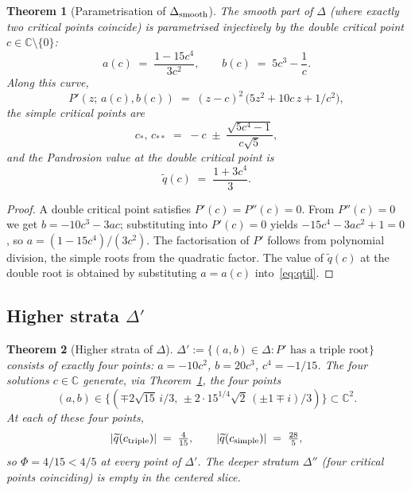 \documentclass[11pt,a4paper]{article}
\newtheorem{theorem}{Theorem}[section]
\begin{document}
\begin{theorem}[Parametrisation of $\Delta_{\rm smooth}$]
\label{thm:param}
The smooth part of $\Delta$ (where exactly two critical points coincide)
is parametrised injectively by the double critical point $c \in
\mathbb{C}\setminus\{0\}$:
\begin{equation}
\boxed{\;
a(c) \;=\; \frac{1 - 15 c^4}{3 c^2},
\qquad
b(c) \;=\; 5 c^3 - \frac{1}{c}.
\;}
\label{eq:param}
\end{equation}
Along this curve,
\begin{equation}
P'(z;\,a(c),b(c)) \;=\; (z-c)^2\,\bigl(5 z^2 + 10 c\,z + 1/c^2\bigr),
\end{equation}
the simple critical points are
\begin{equation}
c_*,\,c_{**} \;=\; -c \;\pm\; \frac{\sqrt{5 c^4 - 1}}{c\sqrt{5}},
\end{equation}
and the Pandrosion value at the double critical point is
\begin{equation}
\boxed{\;
\widetilde q(c) \;=\; \frac{1 + 3 c^4}{3}.
\;}
\label{eq:qtil-double}
\end{equation}
\end{theorem}

\begin{proof}
A double critical point satisfies $P'(c)=P''(c)=0$. From $P''(c)=0$
we get $b=-10c^3-3ac$; substituting into $P'(c)=0$ yields $-15c^4-3ac^2+1=0$,
so $a=(1-15c^4)/(3c^2)$. The factorisation of $P'$ follows from
polynomial division, the simple roots from the quadratic factor.
The value of $\widetilde q(c)$ at the double root is obtained by
substituting $a=a(c)$ into~\eqref{eq:qtil}.
\end{proof}

\subsection{Higher strata $\Delta'$}

\begin{theorem}[Higher strata of $\Delta$]\label{thm:Delta-prime}
$\Delta':=\{(a,b)\in\Delta : P' \text{ has a triple root}\}$ consists of
exactly four points: $a=-10c^2$, $b=20c^3$, $c^4=-1/15$. The four
solutions $c\in\mathbb{C}$ generate, via Theorem~\ref{thm:param},
the four points
\[
(a,b)\in\bigl\{(\mp 2\sqrt{15}\,i/3,\,\pm 2\cdot 15^{1/4}\sqrt 2\,(\pm 1\mp i)/3)\bigr\}\subset\mathbb{C}^2.
\]
At each of these four points,
\begin{equation}
|\widetilde q(c_{\rm triple})| \;=\; \tfrac{4}{15},
\qquad
|\widetilde q(c_{\rm simple})| \;=\; \tfrac{28}{5},
\end{equation}
so $\Phi=4/15<4/5$ at every point of $\Delta'$.
The deeper stratum $\Delta''$ (four critical points coinciding) is
empty in the centered slice.
\end{theorem}
\end{document}
